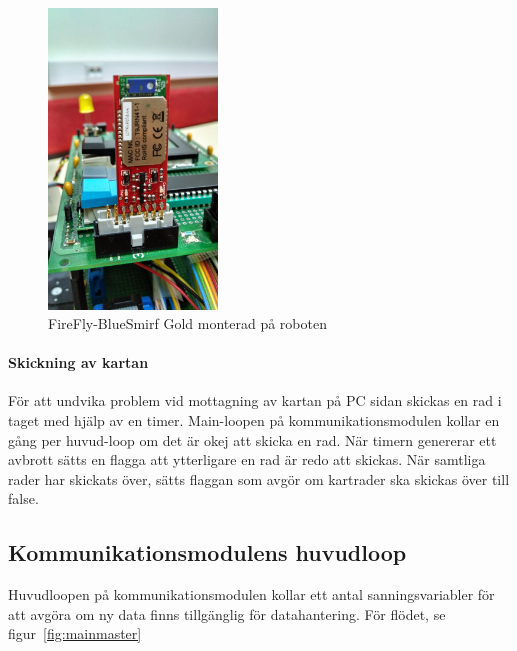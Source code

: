 \documentclass[a4paper,12pt,fleqn]{article}
\begin{document}
\begin{figure}[htp] %
  \begin{center}
  \includegraphics[keepaspectratio=true,width=0.4\textwidth]{bilder/robotbilder/Firefly.jpg}  %
  \end{center}
  \caption{FireFly-BlueSmirf Gold monterad på roboten} %
  \label{fig:firefly}
\end{figure}


\paragraph{Skickning av kartan}
För att undvika problem vid mottagning av kartan på PC sidan skickas en rad i taget med hjälp av en timer. Main-loopen på kommunikationsmodulen kollar en gång per huvud-loop om det är okej att skicka en rad. När timern genererar ett avbrott sätts en flagga att ytterligare en rad är redo att skickas. När samtliga rader har skickats över, sätts flaggan som avgör om kartrader ska skickas över till false.

\subsection{Kommunikationsmodulens huvudloop}

Huvudloopen på kommunikationsmodulen kollar ett antal sanningsvariabler för att avgöra om ny data finns tillgänglig för datahantering. För flödet, se figur~\ref{fig:mainmaster}
\end{document}

